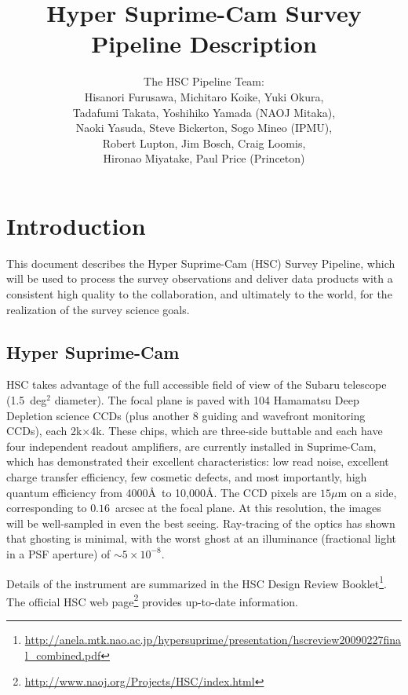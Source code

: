 \documentclass[12pt]{article}
\title{Hyper Suprime-Cam Survey \\
  Pipeline Description}
\author{
  The HSC Pipeline Team: \\
  Hisanori Furusawa,
  Michitaro Koike,
  Yuki Okura, \\
  Tadafumi Takata,
  Yoshihiko Yamada (NAOJ Mitaka), \\
  Naoki Yasuda,
  Steve Bickerton,
  Sogo Mineo (IPMU), \\
  Robert Lupton,
  Jim Bosch,
  Craig Loomis, \\
  Hironao Miyatake,
  Paul Price (Princeton) \\
}
\newcommand\x         {\hbox{$\times$}}
\begin{document}
\maketitle
\pagestyle{headings}

\begin{abstract}
\end{abstract}

\clearpage

\tableofcontents

\clearpage

\section{Introduction}

This document describes the Hyper Suprime-Cam (HSC) Survey Pipeline, which will be used to process the survey
observations and deliver data products with a consistent high quality to the collaboration, and ultimately to
the world, for the realization of the survey science goals.

\subsection{Hyper Suprime-Cam}


HSC takes advantage of the full accessible field of view of the Subaru telescope (1.5~deg$^2$
diameter).  The focal plane is paved with 104 Hamamatsu Deep Depletion science CCDs (plus another 8 guiding
and wavefront monitoring CCDs), each 2k\x 4k. These chips, which are three-side buttable and each have four
independent readout amplifiers, are currently installed in Suprime-Cam, which has demonstrated their excellent
characteristics: low read noise, excellent charge transfer efficiency, few cosmetic defects, and most
importantly, high quantum efficiency from 4000\AA\ to 10,000\AA.  The CCD pixels are $15\mu$m on a side,
corresponding to $0.16$~arcsec at the focal plane. At this resolution, the images will be well-sampled in even
the best seeing.  Ray-tracing of the optics has shown that ghosting is minimal, with the worst ghost at an
illuminance (fractional light in a PSF aperture) of $\sim 5 \times 10^{-8}$.

Details of the instrument are summarized in the HSC
Design Review
Booklet\footnote{\url{http://anela.mtk.nao.ac.jp/hypersuprime/presentation/hscreview20090227final_combined.pdf}}. The
official HSC
web page\footnote{\url{http://www.naoj.org/Projects/HSC/index.html}}
provides up-to-date information.
\end{document}
